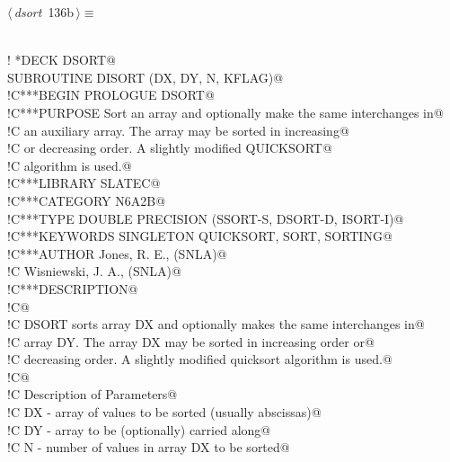 \documentclass[10pt,a4paper,notitlepage]{article}
\begin{document}
\begin{flushleft} \small\label{scrap140}\raggedright\small
{} $\langle\,${\it dsort}\nobreak\ {\footnotesize {136b}}$\,\rangle\equiv$
\vspace{-1ex}
\begin{list}{}{} \item
\mbox{}\verb@@\\
\mbox{}\verb@! *DECK DSORT@\\
\mbox{}\verb@      SUBROUTINE DISORT (DX, DY, N, KFLAG)@\\
\mbox{}\verb@!C***BEGIN PROLOGUE  DSORT@\\
\mbox{}\verb@!C***PURPOSE  Sort an array and optionally make the same interchanges in@\\
\mbox{}\verb@!C            an auxiliary array.  The array may be sorted in increasing@\\
\mbox{}\verb@!C            or decreasing order.  A slightly modified QUICKSORT@\\
\mbox{}\verb@!C            algorithm is used.@\\
\mbox{}\verb@!C***LIBRARY   SLATEC@\\
\mbox{}\verb@!C***CATEGORY  N6A2B@\\
\mbox{}\verb@!C***TYPE      DOUBLE PRECISION (SSORT-S, DSORT-D, ISORT-I)@\\
\mbox{}\verb@!C***KEYWORDS  SINGLETON QUICKSORT, SORT, SORTING@\\
\mbox{}\verb@!C***AUTHOR  Jones, R. E., (SNLA)@\\
\mbox{}\verb@!C           Wisniewski, J. A., (SNLA)@\\
\mbox{}\verb@!C***DESCRIPTION@\\
\mbox{}\verb@!C@\\
\mbox{}\verb@!C   DSORT sorts array DX and optionally makes the same interchanges in@\\
\mbox{}\verb@!C   array DY.  The array DX may be sorted in increasing order or@\\
\mbox{}\verb@!C   decreasing order.  A slightly modified quicksort algorithm is used.@\\
\mbox{}\verb@!C@\\
\mbox{}\verb@!C   Description of Parameters@\\
\mbox{}\verb@!C      DX - array of values to be sorted   (usually abscissas)@\\
\mbox{}\verb@!C      DY - array to be (optionally) carried along@\\
\mbox{}\verb@!C      N  - number of values in array DX to be sorted@\\

\end{list}
\end{flushleft}
\end{document}
